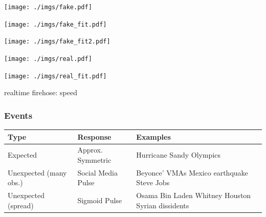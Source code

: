 \documentclass{beamer}
\begin{document}

\begin{frame}
  \begin{center}
    \texttt{[image: ./imgs/fake.pdf]}
  \end{center}
\end{frame}

\begin{frame}
  \begin{center}
    \texttt{[image: ./imgs/fake\_fit.pdf]}
  \end{center}
\end{frame}

\begin{frame}
  \begin{center}
    \texttt{[image: ./imgs/fake\_fit2.pdf]}
  \end{center}
\end{frame}

\begin{frame}
  \begin{center}
    \texttt{[image: ./imgs/real.pdf]}
  \end{center}
\end{frame}

\begin{frame}
  \begin{center}
    \texttt{[image: ./imgs/real\_fit.pdf]}
  \end{center}
\end{frame}


\begin{frame}
\begin{center}
{\Huge realtime firehose: speed}
\end{center}
\end{frame}


\begin{frame}\frametitle{Events}
\begin{table}
\begin{tabular}{ m{2cm} | m{ 2.5cm} | m{4cm}}
\hline
Type & Response & Examples \\ \hline
Expected    & Approx. \newline Symmetric & Hurricane Sandy \newline Olympics \\ \hline
Unexpected (many obs.) & Social Media \newline Pulse & Beyonce' VMAs \newline  Mexico earthquake \newline  Steve Jobs \\ \hline
Unexpected (spread) & Sigmoid \newline Pulse & Osama Bin Laden \newline  Whitney Houston \newline  Syrian dissidents \\ \hline
\end{tabular}
\end{table}
\end{frame}
\end{document}

